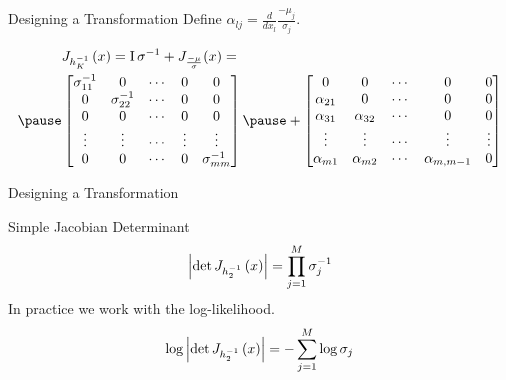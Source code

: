 \documentclass[14pt]{beamer}
\begin{document}
\begin{frame}{Designing a Transformation}
Define $ \alpha_{lj} = \frac{d}{dx_{l}}\frac{-\mu_{j}}{\sigma_{j}} $.
\begin{small}
\begin{equation*}
\begin{aligned}
&\jac{h_{K}^{-1}}{x} = \IMatrix\sigma^{-1} + J_{\frac{-\mu}{\sigma}}(x) = \\ \pause
&\begin{bmatrix}
\sigma^{-1}_{11} & 0 & \cdots & 0 & 0 \\
0 & \sigma^{-1}_{22} & \cdots & 0 & 0 \\
0 & 0 & \cdots & 0 & 0 \\
\vdots & \vdots & \cdots & \vdots & \vdots \\
0 & 0 & \cdots & 0 & \sigma^{-1}_{mm}
\end{bmatrix}
\pause
+
\begin{bmatrix}
0 & 0 & \cdots & 0 & 0 \\
\alpha_{21} & 0 & \cdots & 0 & 0 \\
\alpha_{31} & \alpha_{32} & \cdots & 0 & 0 \\
\vdots & \vdots & \cdots & \vdots & \vdots \\
\alpha_{m1} & \alpha_{m2} & \cdots & \alpha_{m,m-1} & 0
\end{bmatrix}
\end{aligned}
\end{equation*}
\end{small}
\end{frame}

\begin{frame}{Designing a Transformation}
\begin{block}{Simple Jacobian Determinant}
\begin{equation*}
\left|\det J_{h_{2}^{-1}}\left(x\right)\right| = \prod_{j=1}^{M}\sigma^{-1}_{j}
\end{equation*}
\pause
In practice we work with the log-likelihood.
\begin{equation*}
\log\left|\det J_{h_{2}^{-1}}\left(x\right)\right| = -\sum_{j=1}^{M}\log\sigma_{j}
\end{equation*}
\end{block}
\end{frame}
\end{document}
